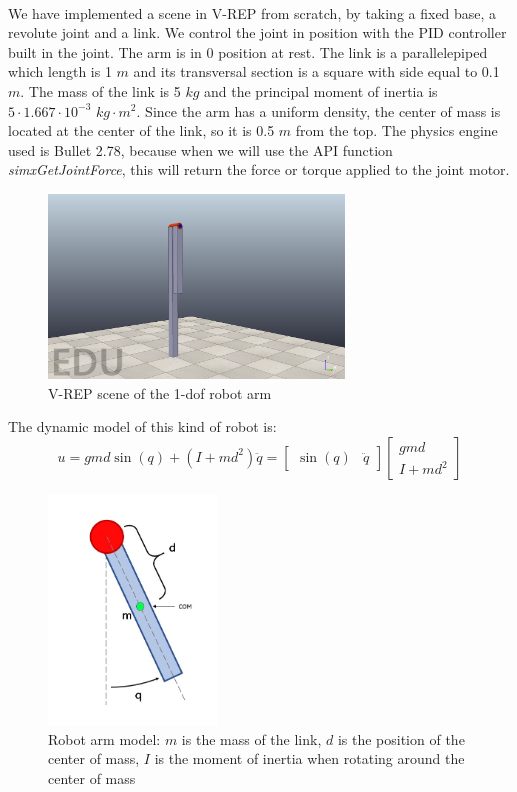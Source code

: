 \documentclass{article}
\begin{document}
\paragraph{} We have implemented a scene in V-REP from scratch, by taking a fixed base, a revolute joint and a link. We control the joint in position with the PID controller built in the joint. The arm is in 0 position at rest. The link is a parallelepiped which length is 1 $m$ and its transversal section is a square with side equal to 0.1 $m$. The mass of the link is 5 $kg$ and the principal moment of inertia is $5\cdot1.667\cdot10^{-3}$ $kg\cdot m^2$. Since the arm has a uniform density, the center of mass is located at the center of the link, so it is 0.5 $m$ from the top. The physics engine used is Bullet 2.78, because when we will use the API function \textit{simxGetJointForce}, this will return the force or torque applied to the joint motor.
\begin{figure}[!htbp]
\centering
\includegraphics[width=0.7\textwidth]{images/1-dof/scene.png}
\caption{V-REP scene of the 1-dof robot arm}
\end{figure}
\FloatBarrier
The dynamic model of this kind of robot is:
\[u=gmd \sin(q) + (I+md^2)\ddot{q}= \begin{bmatrix}
\sin(q) & \ddot{q}
\end{bmatrix}\begin{bmatrix}
gmd \\ I +md^2
\end{bmatrix}\]
\begin{figure}[!htbp]
\centering
\includegraphics[width=0.4\textwidth]{images/1-dof/model.jpeg}
\caption{Robot arm model: $m$ is the mass of the link, $d$ is the position of the center of mass, $I$ is the moment of inertia when rotating around the center of mass}
\end{figure}
\end{document}
